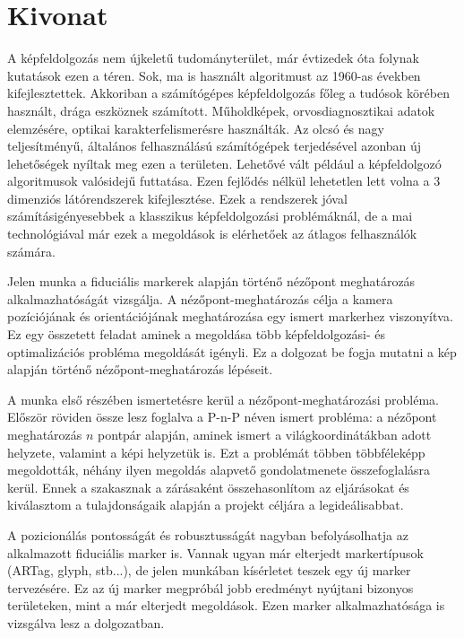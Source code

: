 \chapter*{Kivonat}
A képfeldolgozás nem újkeletű tudományterület, már évtizedek óta folynak kutatások ezen a téren.
Sok, ma is használt algoritmust az 1960-as években kifejlesztettek.
Akkoriban a számítógépes képfeldolgozás főleg a tudósok körében használt, drága eszköznek számított.
Műholdképek, orvosdiagnosztikai adatok elemzésére, optikai karakterfelismerésre használták.
Az olcsó és nagy teljesítményű, általános felhasználású számítógépek terjedésével azonban új lehetőségek nyíltak meg ezen a területen.
Lehetővé vált például a képfeldolgozó algoritmusok valósidejű futtatása.
Ezen fejlődés nélkül lehetetlen lett volna a 3 dimenziós látórendszerek kifejlesztése.
Ezek a rendszerek jóval számításigényesebbek a klasszikus képfeldolgozási problémáknál, de a mai technológiával már ezek a megoldások is elérhetőek az átlagos felhasználók számára.

Jelen munka a fiduciális markerek alapján történő nézőpont meghatározás alkalmazhatóságát vizsgálja.
A nézőpont-meghatározás célja a kamera pozíciójának és orientációjának meghatározása egy ismert markerhez viszonyítva.
Ez egy összetett feladat aminek a megoldása több képfeldolgozási- és optimalizációs probléma megoldását igényli.
Ez a dolgozat be fogja mutatni a kép alapján történő nézőpont-meghatározás lépéseit.

A munka első részében ismertetésre kerül a nézőpont-meghatározási probléma.
Először röviden össze lesz foglalva a P-n-P néven ismert probléma: a nézőpont meghatározás $n$ pontpár alapján, aminek ismert a világkoordinátákban adott helyzete, valamint a képi helyzetük is.
Ezt a problémát többen többféleképp megoldották, néhány ilyen megoldás alapvető gondolatmenete összefoglalásra kerül.
Ennek a szakasznak a zárásaként összehasonlítom az eljárásokat és kiválasztom a tulajdonságaik alapján a projekt céljára a legideálisabbat.

A pozicionálás pontosságát és robusztusságát nagyban befolyásolhatja az alkalmazott fiduciális marker is.
Vannak ugyan már elterjedt markertípusok (ARTag, glyph, stb...), de jelen munkában kísérletet teszek egy új marker tervezésére.
Ez az új marker megpróbál jobb eredményt nyújtani bizonyos területeken, mint a már elterjedt megoldások.
Ezen marker alkalmazhatósága is vizsgálva lesz a dolgozatban.

